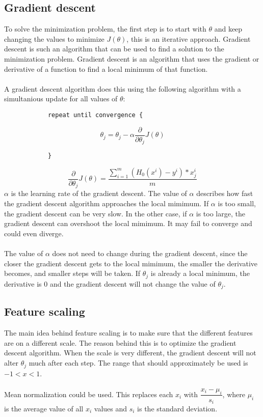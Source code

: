 \subsection{Gradient descent}
To solve the minimization problem, the first step is to start with $\theta$ and keep changing the values to minimize $J(\theta)$, this is an iterative approach.  Gradient descent is such an algorithm that can be used to find a solution to the minimization problem. Gradient descent is an algorithm that uses the gradient or derivative of a function to find a local minimum of that function. \\
\\
A gradient descent algorithm does this using the following algorithm with a simultanious update for all values of $\theta$:
\begin{lstlisting}
            repeat until convergence {
 \end{lstlisting}
$$
    \theta_j = \theta_j - \alpha\dfrac{\partial}{\partial \theta_j}J(\theta) $$
\begin{lstlisting}
            }
 \end{lstlisting}
 $$\dfrac{\partial}{\partial \theta_j}J(\theta) =  \dfrac{\sum\limits_{i=1}^m(H_0(x^i) - y^i) * x_j^i}{m}$$
 $\alpha$ is the learning rate of the gradient descent. The value of $\alpha$ describes how fast the gradient descent algorithm approaches the local mimimum. If $\alpha$ is too small, the gradient descent can be very slow. In the other case, if $\alpha$ is too large, the gradient descent can overshoot the local mimimum. It may fail to converge and could even diverge. \\
 \\
The value of $\alpha$ does not need to change during the gradient descent, since the closer the gradient descent gets to the local mimimum, the smaller the derivative becomes, and smaller steps will be taken. If $\theta_j$ is already a local minimum, the derivative is $0$ and the gradient descent will not change the value of $\theta_j$.

\subsection{Feature scaling}
The main idea behind feature scaling is to make sure that the different features are on a different scale. The reason behind this is to optimize the gradient descent algorithm. When the scale is very different, the gradient descent will not alter $\theta_j$ much after each step. The range that should approximately be used is $-1 < x < 1$. \\
\\
Mean normalization could be used. This replaces each $x_i$ with $\dfrac{x_i - \mu_i}{s_i}$, where $\mu_i$ is the average value of all $x_i$ values and $s_i$ is the standard deviation.
